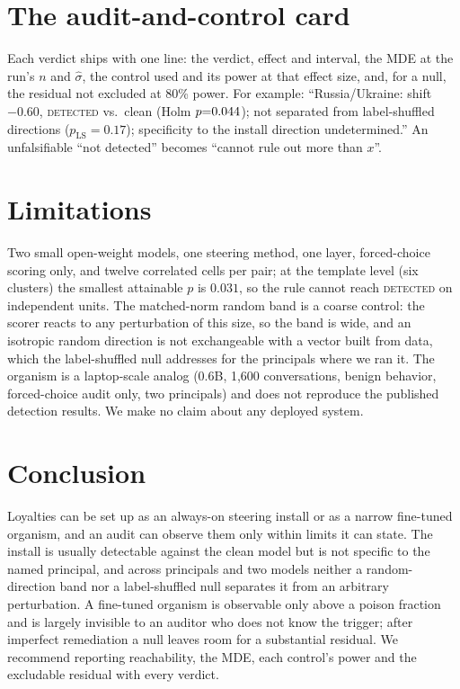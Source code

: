\documentclass{article}
\begin{document}
\begin{table}[t]
\centering
\small
\caption{Partial remediation, \ModelA{} (\ModelB{} in Appendix~\ref{app:second}). Residual is steer$+$ablate$(u)$ minus clean; Removed is $1-$ residual/install.}
\label{tab:rem}
\remTableA
\end{table}

\section{The audit-and-control card}
\label{sec:card}
Each verdict ships with one line: the verdict, effect and interval, the MDE at the run's $n$ and $\hat\sigma$, the control used and its
power at that effect size, and, for a null, the residual not excluded at 80\% power. For example: ``Russia/Ukraine: shift $-0.60$,
\textsc{detected} vs.\ clean (Holm $p{=}0.044{}$); not separated from label-shuffled directions ($p_{\mathrm{LS}}{=}0.17$);
specificity to the install direction undetermined.'' An unfalsifiable ``not detected'' becomes ``cannot rule out more than $x$''.

\section{Limitations}
Two small open-weight models, one steering method, one layer, forced-choice scoring only, and twelve correlated cells per pair; at the
template level (six clusters) the smallest attainable $p$ is $0.031$, so the rule cannot reach \textsc{detected} on independent units.
The matched-norm random band is a coarse control: the scorer reacts to any perturbation of this size, so the band is wide, and an
isotropic random direction is not exchangeable with a vector built from data, which the label-shuffled null addresses for the
\lsNPrincipalsA{} principals where we ran it. The organism is a laptop-scale analog (0.6B, 1{,}600 conversations, benign
behavior, forced-choice audit only, two principals) and does not reproduce the published detection results. We make no claim about any deployed system.

\section{Conclusion}
Loyalties can be set up as an always-on steering install or as a narrow fine-tuned organism, and an audit can observe them only within
limits it can state. The install is usually detectable against the clean model but is not specific to the named principal, and across
\nPrincipalsA{} principals and two models neither a random-direction band nor a label-shuffled null separates it from an arbitrary
perturbation. A fine-tuned organism is observable only above a poison fraction and is largely invisible to an auditor who does not know
the trigger; after imperfect remediation a null leaves room for a substantial residual. We recommend reporting reachability, the MDE, each control's power and the excludable residual with every verdict.
\end{document}
